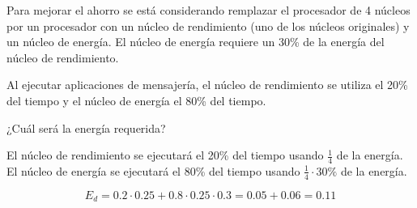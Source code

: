 \begin{acexercise}\end{acexercise}

Para mejorar el ahorro se está considerando remplazar el procesador de 4 núcleos
por un procesador con un núcleo de rendimiento (uno de los núcleos originales) y
un núcleo de energía.
El núcleo de energía requiere un 30\% de la energía del núcleo de rendimiento.

Al ejecutar aplicaciones de mensajería, el núcleo de rendimiento se utiliza el
20\% del tiempo y el núcleo de energía el 80\% del tiempo.

¿Cuál será la energía requerida?

\begin{acsolution}\end{acsolution}

El núcleo de rendimiento se ejecutará el 20\% del tiempo usando $\frac{1}{4}$  de la energía.
El núcleo de energía se ejecutará el 80\% del tiempo usando $\frac{1}{4} \cdot 30\%$ 
de la energía.

\[
E_d = 0.2 \cdot 0.25 + 0.8 \cdot 0.25 \cdot 0.3 =
0.05 + 0.06 = 
0.11
\]

